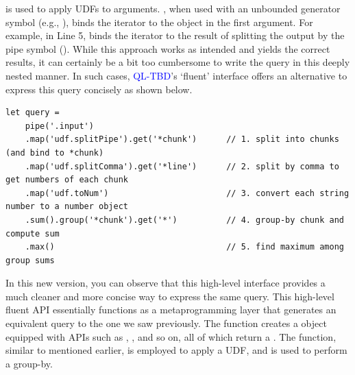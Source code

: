 \documentclass[runningheads]{llncs}
\newcommand{\lang}{\textcolor{blue}{QL-TBD}}
\begin{document}
 is used to apply UDFs to arguments.
, when used with an unbounded generator symbol (e.g., ), binds the
iterator to the object in the first argument.
For example, in Line 5,  binds the iterator
 to the result of splitting the output by the pipe symbol (\inline{|}).
While this approach works as intended and yields the correct results, it can certainly be
a bit too cumbersome to write the query in this deeply nested manner.
In such cases, \lang{}'s `fluent' interface offers an alternative to express
this query concisely as shown below.


\begin{lstlisting}[style=JavaScript, columns=flexible]
let query =
    pipe('.input')
    .map('udf.splitPipe').get('*chunk')      // 1. split into chunks (and bind to *chunk)
    .map('udf.splitComma').get('*line')      // 2. split by comma to get numbers of each chunk
    .map('udf.toNum')                        // 3. convert each string number to a number object
    .sum().group('*chunk').get('*')          // 4. group-by chunk and compute sum
    .max()                                   // 5. find maximum among group sums
\end{lstlisting}

In this new version, you can observe that this high-level interface provides a
much cleaner and more concise way to express the same query. 
This high-level fluent API essentially functions as a metaprogramming layer
that generates an equivalent query to the one we saw previously.
The  function creates a  object equipped with
APIs such as , , and so on, all of which return a
.
The  function, similar to  mentioned earlier,
is employed to apply a UDF, and  is used to perform a group-by.


\end{document}

